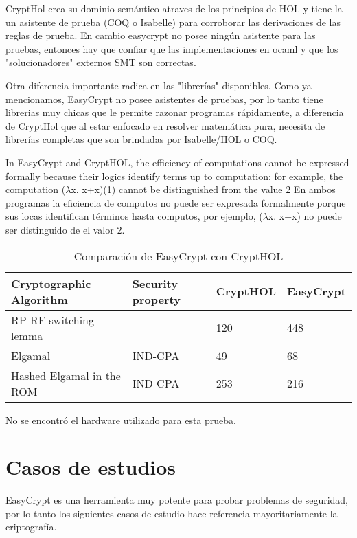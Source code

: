 \documentclass[runningheads,a4paper]{llncs}
\begin{document}
CryptHol crea su dominio semántico atraves de los principios de HOL y tiene la un asistente de prueba (COQ o Isabelle) para corroborar las derivaciones de las reglas de prueba. En cambio easycrypt no posee ningún asistente para las pruebas, entonces hay que confiar que las implementaciones en ocaml y que los "solucionadores" externos SMT son correctas.

Otra diferencia importante radica en las "librerías" disponibles. Como ya mencionamos, EasyCrypt no posee asistentes de pruebas, por lo tanto tiene librerias muy chicas que le permite razonar programas rápidamente, a diferencia de CryptHol que al estar enfocado en resolver matemática pura, necesita de librerías completas que son brindadas por Isabelle/HOL o COQ.

In EasyCrypt and CryptHOL, the efficiency of computations
cannot be expressed formally because their logics identify terms up to computation:
for example, the computation ($\lambda$x. x+x)(1) cannot be distinguished from the value 2
En ambos programas la eficiencia de computos no puede ser expresada formalmente porque sus locas identifican términos hasta computos, por ejemplo, ($\lambda$x. x+x) no puede ser distinguido de el valor 2.\cite{article8}

\begin{table}
  \caption{Comparación de EasyCrypt con CryptHOL}
  \label{tab:simple2}
  \centering
  \begin{tabular}{ |p{4cm}|p{1.5cm}|p{1.5cm}|p{1.5cm}|  }
 \hline
 Cryptographic Algorithm & Security property & CryptHOL & EasyCrypt\\\cline{1-4}
 \hline
 RP-RF switching lemma &  & 120 & 448\\
 Elgamal & IND-CPA & 49  & 68\\
 Hashed Elgamal in the ROM & IND-CPA & 253 &  216\\
 \hline
\end{tabular}
\end{table}


No se encontró el hardware utilizado para esta prueba.




\section{Casos de estudios}
EasyCrypt es una herramienta muy potente para probar problemas de seguridad, por lo tanto los siguientes casos de estudio hace referencia mayoritariamente la criptografía.
\end{document}
